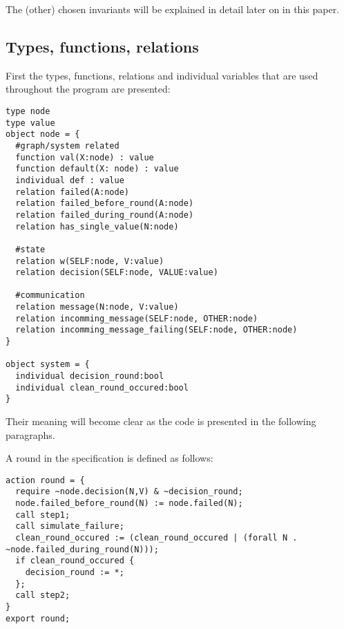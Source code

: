 \documentclass[fleqn]{article}
\begin{document}
The (other) chosen invariants will be explained in detail later on in this paper.

\subsection{Types, functions, relations}
First the types, functions, relations and individual variables that are used throughout the program are presented:


\begin{mdframed}[backgroundcolor=light-gray, roundcorner=10pt,leftmargin=1, rightmargin=1, innerleftmargin=15, innertopmargin=15,innerbottommargin=15, outerlinewidth=1, linecolor=light-gray]
\begin{lstlisting}
type node
type value
object node = {
  #graph/system related
  function val(X:node) : value
  function default(X: node) : value
  individual def : value
  relation failed(A:node)
  relation failed_before_round(A:node)
  relation failed_during_round(A:node)
  relation has_single_value(N:node)

  #state
  relation w(SELF:node, V:value)
  relation decision(SELF:node, VALUE:value)

  #communication
  relation message(N:node, V:value)
  relation incomming_message(SELF:node, OTHER:node)
  relation incomming_message_failing(SELF:node, OTHER:node)
}

object system = {
  individual decision_round:bool
  individual clean_round_occured:bool
}
\end{lstlisting}
\end{mdframed}

Their meaning will become clear as the code is presented in the following paragraphs.


A round in the specification is defined as follows:
\begin{mdframed}[backgroundcolor=light-gray, roundcorner=10pt,leftmargin=1, rightmargin=1, innerleftmargin=15, innertopmargin=15,innerbottommargin=15, outerlinewidth=1, linecolor=light-gray]
\begin{lstlisting}
action round = {
  require ~node.decision(N,V) & ~decision_round;
  node.failed_before_round(N) := node.failed(N);
  call step1;
  call simulate_failure;
  clean_round_occured := (clean_round_occured | (forall N . ~node.failed_during_round(N)));
  if clean_round_occured {
    decision_round := *;
  };
  call step2;
}
export round;
\end{lstlisting}
\end{mdframed}
\end{document}
